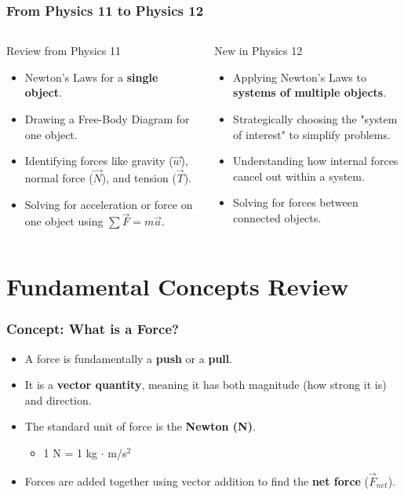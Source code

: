 \documentclass{beamer}
\begin{document}
\begin{frame}
\frametitle{From Physics 11 to Physics 12}
\begin{columns}[T]
\begin{alertblock}{Review from Physics 11}
\begin{itemize}
    \item Newton's Laws for a \textbf{single object}.
    \item Drawing a Free-Body Diagram for one object.
    \item Identifying forces like gravity ($\vec{w}$), normal force ($\vec{N}$), and tension ($\vec{T}$).
    \item Solving for acceleration or force on one object using $\sum \vec{F} = m\vec{a}$.
\end{itemize}
\end{alertblock}

\begin{exampleblock}{New in Physics 12}
\begin{itemize}
    \item Applying Newton's Laws to \textbf{systems of multiple objects}.
    \item Strategically choosing the "system of interest" to simplify problems.
    \item Understanding how internal forces cancel out within a system.
    \item Solving for forces between connected objects.
\end{itemize}
\end{exampleblock}
\end{columns}
\end{frame}

\section{Fundamental Concepts Review}

\begin{frame}
\frametitle{Concept: What is a Force?}
\begin{itemize}
    \item A force is fundamentally a \textbf{push} or a \textbf{pull}. \pause
    \item It is a \textbf{vector quantity}, meaning it has both \alert{magnitude} (how strong it is) and \alert{direction}. \pause
    \item The standard unit of force is the \textbf{Newton (N)}.
    \begin{itemize}
        \item 1 N = 1 kg $\cdot$ m/s$^2$
    \end{itemize} \pause
    \item Forces are added together using vector addition to find the \textbf{net force} ($\vec{F}_{net}$).
\end{itemize}
\end{frame}
\end{document}
